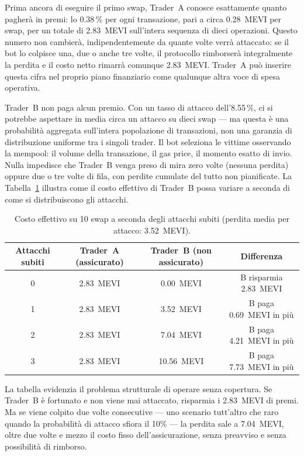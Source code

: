 \documentclass[a4paper,11pt]{article}
\begin{document}
Prima ancora di eseguire il primo swap, Trader~A conosce esattamente quanto
pagherà in premi: lo \num{0,38}\,\% per ogni transazione, pari a circa
\num{0,28}~MEVI per swap, per un totale di \num{2,83}~MEVI sull'intera
sequenza di dieci operazioni. Questo numero non cambierà, indipendentemente
da quante volte verrà attaccato: se il bot lo colpisce una, due o anche tre
volte, il protocollo rimborserà integralmente la perdita e il costo netto
rimarrà comunque \num{2,83}~MEVI. Trader~A può inserire questa cifra nel
proprio piano finanziario come qualunque altra voce di spesa operativa.

Trader~B non paga alcun premio. Con un tasso di attacco dell'\num{8,55}\,\%,
ci si potrebbe aspettare in media circa un attacco su dieci swap --- ma questa
è una probabilità aggregata sull'intera popolazione di transazioni, non una
garanzia di distribuzione uniforme tra i singoli trader. Il bot seleziona le
vittime osservando la mempool: il volume della transazione, il gas price, il
momento esatto di invio. Nulla impedisce che Trader~B venga preso di mira zero
volte (nessuna perdita) oppure due o tre volte di fila, con perdite cumulate
del tutto non pianificate. La Tabella~\ref{tab:scenari} illustra come il costo
effettivo di Trader~B possa variare a seconda di come si distribuiscono
gli attacchi.

\begin{table}[h]
\centering
\caption{Costo effettivo su 10 swap a seconda degli attacchi subiti
         (perdita media per attacco: \num{3,52}~MEVI).}
\label{tab:scenari}
\small
\begin{tabular}{cccc}
\toprule
\textbf{Attacchi subiti} & \textbf{Trader~A (assicurato)}
  & \textbf{Trader~B (non assicurato)} & \textbf{Differenza} \\
\midrule
0 & \num{2,83}~MEVI & \num{0,00}~MEVI & B risparmia \num{2,83}~MEVI \\
1 & \num{2,83}~MEVI & \num{3,52}~MEVI & B paga \num{0,69}~MEVI in più \\
2 & \num{2,83}~MEVI & \num{7,04}~MEVI & B paga \num{4,21}~MEVI in più \\
3 & \num{2,83}~MEVI & \num{10,56}~MEVI & B paga \num{7,73}~MEVI in più \\
\bottomrule
\end{tabular}
\end{table}

La tabella evidenzia il problema strutturale di operare senza copertura. Se
Trader~B è fortunato e non viene mai attaccato, risparmia i \num{2,83}~MEVI
di premi. Ma se viene colpito due volte consecutive --- uno scenario tutt'altro
che raro quando la probabilità di attacco sfiora il 10\% --- la perdita sale a
\num{7,04}~MEVI, oltre due volte e mezzo il costo fisso dell'assicurazione,
senza preavviso e senza possibilità di rimborso.
\end{document}
